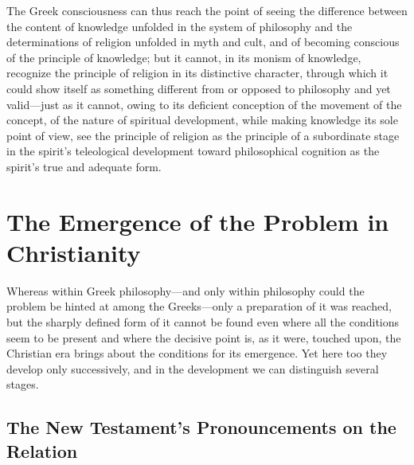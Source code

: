 \documentclass[12pt,a4paper]{book}
\begin{document}
The Greek consciousness can thus reach the point of seeing the
difference between the content of knowledge unfolded in the system of
philosophy and the determinations of religion unfolded in myth and cult,
and of becoming conscious of the principle of knowledge; but it cannot,
in its monism of knowledge, recognize the principle of religion in its
distinctive character, through which it could show itself as something
different from or opposed to philosophy and yet valid---just as it
cannot, owing to its deficient conception of the movement of the
concept, of the nature of spiritual development, while making knowledge
its sole point of view, see the principle of religion as the principle
of a subordinate stage in the spirit's teleological development toward
philosophical cognition as the spirit's true and adequate form.

\section{The Emergence of the Problem in Christianity}
\label{sec:christianity}

\noindent Whereas within Greek philosophy---and only within philosophy
could the problem be hinted at among the Greeks---only a preparation of it
was reached, but the sharply defined form of it cannot be found even
where all the conditions seem to be present and where the decisive point is,
as it were, touched upon, the Christian era brings about the conditions for
its emergence. Yet here too they develop only successively, and in the
development we can distinguish several stages.

\subsection{The New Testament's Pronouncements on the Relation}
\label{ssec:nt}
\end{document}
